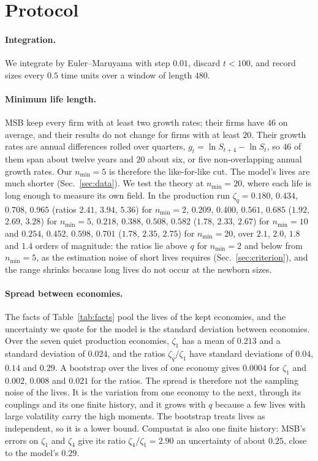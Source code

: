 \documentclass[pre,twocolumn,superscriptaddress,nofootinbib]{revtex4-2}
\begin{document}
\section{Protocol}
\label{app:protocol}

\paragraph{Integration.}  We integrate by Euler--Maruyama with step $0.01$, discard $t<100$, and record sizes
every $0.5$ time units over a window of length $480$.

\paragraph{Minimum life length.}  MSB keep every firm with at least two growth rates; their firms have $46$ on
average, and their results do not change for firms with at least $20$.  Their growth rates are annual
differences rolled over quarters, $g_t=\ln S_{t+4}-\ln S_t$, so $46$ of them span about twelve years and $20$
about six, or five non-overlapping annual growth rates.  Our $n_{\min}=5$ is therefore the like-for-like cut.
The model's lives are much shorter (Sec.~\ref{sec:data}).  We test the theory at $n_{\min}=20$, where each
life is long enough to measure its own field.  In
the production run $\zeta_q=0.180$, $0.434$, $0.708$, $0.965$ (ratios $2.41$, $3.94$, $5.36$) for $n_{\min}=2$, $0.209$,
$0.400$, $0.561$, $0.685$ ($1.92$, $2.69$, $3.28$) for $n_{\min}=5$, $0.218$, $0.388$, $0.508$, $0.582$ ($1.78$, $2.33$,
$2.67$) for $n_{\min}=10$ and $0.254$, $0.452$, $0.598$, $0.701$ ($1.78$, $2.35$, $2.75$) for $n_{\min}=20$, over $2.1$,
$2.0$, $1.8$ and $1.4$ orders of magnitude: the ratios lie above $q$ for $n_{\min}=2$ and below from $n_{\min}=5$, as the
estimation noise of short lives requires (Sec.~\ref{sec:criterion}), and the range shrinks because long lives
do not occur at the newborn sizes.

\paragraph{Spread between economies.}  The facts of Table~\ref{tab:facts} pool the lives of the kept economies,
and the uncertainty we quote for the model is the standard deviation between economies.  Over the seven quiet
production economies, $\zeta_1$ has a mean of $0.213$ and a standard deviation of $0.024$, and the ratios
$\zeta_q/\zeta_1$ have standard deviations of $0.04$, $0.14$ and $0.29$.  A bootstrap over the lives of one
economy gives $0.0004$ for $\zeta_1$ and $0.002$, $0.008$ and $0.021$ for the ratios.  The spread is therefore not
the sampling noise of the lives.  It is the variation from one economy to the next, through its couplings and its
one finite history, and it grows with $q$ because a few lives with large volatility carry the high moments.  The
bootstrap treats lives as independent, so it is a lower bound.  Compustat is also one finite history: MSB's errors
on $\zeta_1$ and $\zeta_4$ give its ratio $\zeta_4/\zeta_1=2.90$ an uncertainty of about $0.25$, close to the
model's $0.29$.
\end{document}
